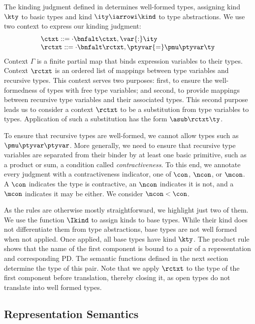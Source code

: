 The kinding judgment defined in  determines
well-formed \ddc{} types, assigning kind $\kty$ to basic types and
kind $\ity \iarrowi \kind$ to type abstractions.  We use two context to express our kinding judgment:
\[
\begin{array}{l}
\ctxt \mathrel{::=} \cdot \bnfalt \ctxt,{\var{:}\ity}\\
\rctxt \mathrel{::=} \cdot \bnfalt \rctxt,\ptyvar{=}\pmu \ptyvar \ty
\end{array}
\]
Context $\Gamma$ is a finite partial map that binds expression
variables to their types.
Context $\rctxt$ is an ordered list of mappings between type variables and recursive types.
This context serves two purposes: first, to ensure the well-formedness
of types with free type variables; and second, to provide mappings
between recursive type variables and their associated types. 
This second purpose leads us to consider a context $\rctxt$ to be a
substitution from type variables to types. Application of such a
substitution has the form $\asub \rctxt \ty$.

To ensure that recursive types are well-formed, 
we cannot allow types such as $\pmu \ptyvar
\ptyvar$. More generally, we need to ensure that
recursive type variables are separated from their binder by at least
one basic primitive, such as a product or sum, a condition called {\it contractiveness}. To this end, we annotate every judgment with a contractiveness
indicator, one of $\con$, $\ncon$, or $\mcon$. A
$\con$ indicates the type is contractive, an $\ncon$
indicates it is not, and a $\mcon$ indicates it may be either. 
We consider $\ncon < \con$. 

As the rules are otherwise mostly straightforward, we highlight
just two of them. We use the function $\Ikind$ to assign kinds to base types.
While their kind does not differentiate them from type
abstractions, base types are not well formed when not applied.  
Once applied, all base types have kind $\kty$. The product rule
shows that the name of the first component is bound to a pair of a representation and corresponding PD.
The semantic functions defined in the next section determine the type of this pair.
Note that we apply $\rctxt$ to the type of the first component before
translation, thereby closing it,
 as open \ddc{}
types do not translate into well formed \implang{} types.

\subsection{Representation Semantics}
\label{sec:intty-sem}

